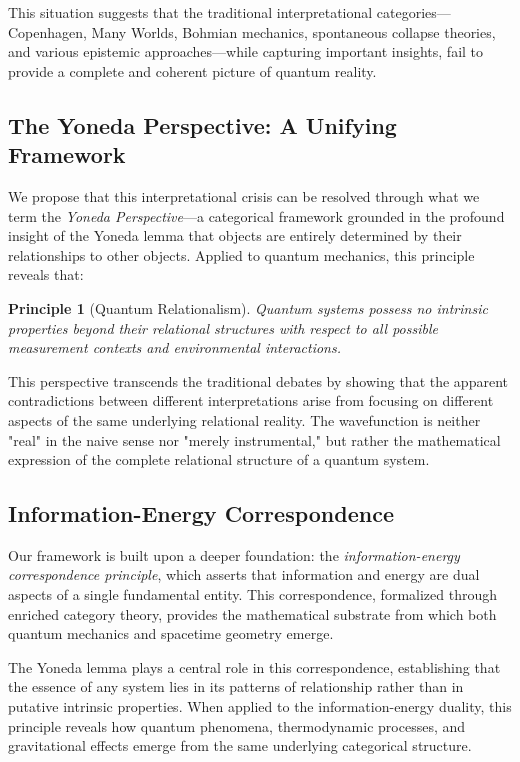 \documentclass[12pt,a4paper]{article}
\newtheorem{principle}[theorem]{Principle}
\begin{document}
This situation suggests that the traditional interpretational categories—Copenhagen, Many Worlds, Bohmian mechanics, spontaneous collapse theories, and various epistemic approaches—while capturing important insights, fail to provide a complete and coherent picture of quantum reality.

\subsection{The Yoneda Perspective: A Unifying Framework}

We propose that this interpretational crisis can be resolved through what we term the \emph{Yoneda Perspective}—a categorical framework grounded in the profound insight of the Yoneda lemma that objects are entirely determined by their relationships to other objects. Applied to quantum mechanics, this principle reveals that:

\begin{principle}[Quantum Relationalism]
Quantum systems possess no intrinsic properties beyond their relational structures with respect to all possible measurement contexts and environmental interactions.
\end{principle}

This perspective transcends the traditional debates by showing that the apparent contradictions between different interpretations arise from focusing on different aspects of the same underlying relational reality. The wavefunction is neither "real" in the naive sense nor "merely instrumental," but rather the mathematical expression of the complete relational structure of a quantum system.

\subsection{Information-Energy Correspondence}

Our framework is built upon a deeper foundation: the \emph{information-energy correspondence principle}, which asserts that information and energy are dual aspects of a single fundamental entity. This correspondence, formalized through enriched category theory, provides the mathematical substrate from which both quantum mechanics and spacetime geometry emerge.

The Yoneda lemma plays a central role in this correspondence, establishing that the essence of any system lies in its patterns of relationship rather than in putative intrinsic properties. When applied to the information-energy duality, this principle reveals how quantum phenomena, thermodynamic processes, and gravitational effects emerge from the same underlying categorical structure.
\end{document}
